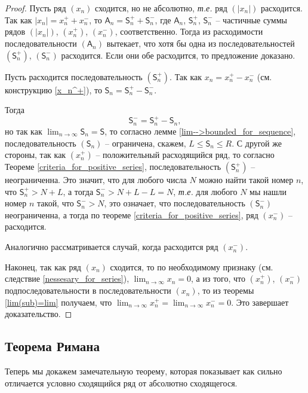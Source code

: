 \begin{proof}
    Пусть ряд $(x_n)$ сходится, но не абсолютно, \textit{т.е.} ряд $(|x_n|)$ расходится. Так как $|x_n| = x_n^+ + x_n^-$, то $\mathsf{A}_n = \mathsf{S}_n^+ + \mathsf{S}_n^-$, где $\mathsf{A}_n$, $\mathsf{S}_n^+$, $\mathsf{S}_n^-$ -- частичные суммы рядов $(|x_n|)$, $(x_n^+)$, $(x_n^-)$, соответственно. Тогда из расходимости последовательности $(\mathsf{A}_n)$ вытекает, что хотя бы одна из последовательностей $(\mathsf{S}_n^+)$, $(\mathsf{S}_n^-)$ расходится. Если они обе расходится, то предложение доказано.

    Пусть расходится последовательность $(\mathsf{S}_n^+)$. Так как $x_n = x_n^+ - x_n^-$ (см. конструкцию \ref{x_n^+}), то $\mathsf{S}_n = \mathsf{S}_n^+ - \mathsf{S}_n^-$.
    
    Тогда
    \[
     \mathsf{S}_n^- = \mathsf{S}_n^+ - \mathsf{S}_n,
    \]
но так как $\lim_{n \to \infty} \mathsf{S}_n = \mathsf{S}$, то согласно лемме \ref{lim-->bounded_for_sequence}, последовательность $(\mathsf{S}_n)$ -- ограничена, скажем, $L \le \mathsf{S}_n \le R$. С другой же стороны, так как $(x_n^+)$ -- положительный расходящийся ряд, то согласно Теореме \ref{criteria_for_positive_series}, последовательность $(\mathsf{S}_n^+)$ -- неограниченна. Это значит, что для любого числа $N$ можно найти такой номер $n$, что $\mathsf{S}_n^+ >N+L$, а тогда $\mathsf{S}_n^- > N+L-L =N$, \textit{т.е.} для любого $N$ мы нашли номер $n$ такой, что $\mathsf{S}_n^- >N$, это означает, что последовательность $(\mathsf{S}_n^-)$ неограниченна, а тогда по теореме \ref{criteria_for_positive_series}, ряд $(x_n^-)$ -- расходится. 

Аналогично рассматривается случай, когда расходится ряд $(x_n^-)$. 

Наконец, так как ряд $(x_n)$ сходится, то по необходимому признаку (см. следствие \ref{nessesary_for_series}), $\lim_{n \to \infty} x_n = 0$, а из того, что $(x_n^+)$, $(x_n^-)$ подпоследовательности в последовательности $(x_n)$, то из теоремы \ref{lim(sub)=lim} получаем, что $\lim_{n \to \infty} x_n^+ = \lim_{n \to \infty} x_n^- = 0.$ Это завершает доказательство.
\end{proof}

\subsection{Теорема Римана}

Теперь мы докажем замечательную теорему, которая показывает как сильно отличается условно сходящийся ряд от абсолютно сходящегося.

